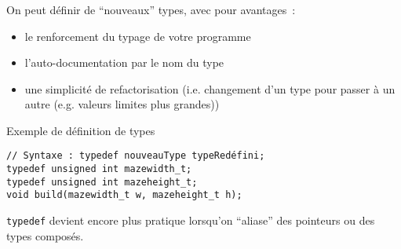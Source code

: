 \begin{frame}[containsverbatim]
  \frametitle{\secname}
  \framesubtitle{\subsecname}

  On peut définir de ``nouveaux'' types, avec pour avantages~:
  \begin{itemize}
    \item le renforcement du typage de votre programme
    \item l'auto-documentation par le nom du type
    \item une simplicité de refactorisation (i.e. changement d'un type pour passer à un autre (e.g. valeurs limites plus grandes))
  \end{itemize}
  \begin{exampleblock}{Exemple de définition de types}
    \begin{verbatim}
// Syntaxe : typedef nouveauType typeRedéfini;
typedef unsigned int mazewidth_t;
typedef unsigned int mazeheight_t;
void build(mazewidth_t w, mazeheight_t h);\end{verbatim}
  \end{exampleblock}
  \par
  \texttt{typedef} devient encore plus pratique lorsqu'on ``aliase'' des pointeurs ou des types composés.
\end{frame}

